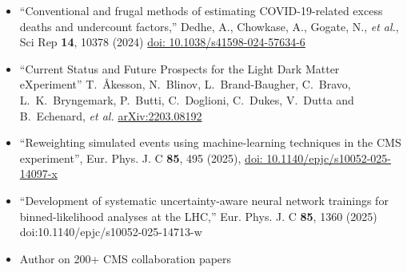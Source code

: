 \begin{flushleft}
{\fontsize{9pt}{1em}\bodyfontlight\upshape\color{black}
\begin{itemize}
\item ``Conventional and frugal methods of estimating COVID-19-related excess deaths and undercount factors,'' Dedhe, A., Chowkase, A., Gogate, N., \textit{et al.},
Sci Rep \textbf{14}, 10378 (2024)
\href{https://doi.org/10.1038/s41598-024-57634-6}{doi: 10.1038/s41598-024-57634-6}
\item ``Current Status and Future Prospects for the Light Dark Matter eXperiment''  T.~\r{A}kesson, N.~Blinov, L.~Brand-Baugher, C.~Bravo, L.~K.~Bryngemark, P.~Butti, C.~Doglioni, C.~Dukes, V.~Dutta and B.~Echenard, \textit{et al.}
\href{http://arxiv.org/abs/2203.08192}{arXiv:2203.08192}
\item ``Reweighting simulated events using machine-learning techniques in the CMS experiment'', Eur. Phys. J. C \textbf{85}, 495 (2025),
\href{https://doi.org/10.1140/epjc/s10052-025-14097-x}{doi: 10.1140/epjc/s10052-025-14097-x}
\item ``Development of systematic uncertainty-aware neural network trainings for binned-likelihood analyses at the LHC,'' Eur. Phys. J. C \textbf{85}, 1360 (2025) doi:10.1140/epjc/s10052-025-14713-w
\item Author on 200+ CMS collaboration papers
\end{itemize}
}
\end{flushleft}
